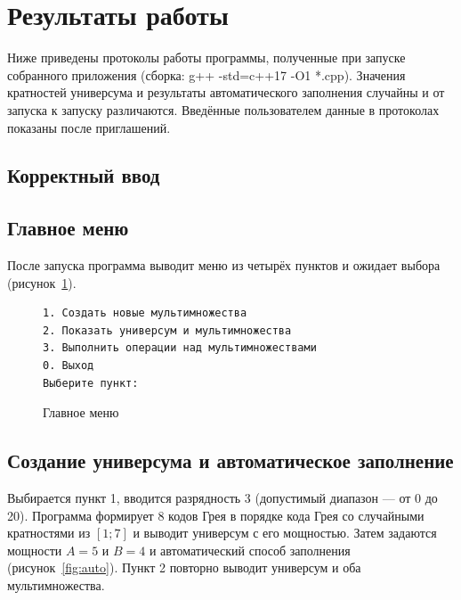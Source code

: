 \documentclass[14pt,a4paper]{extarticle}
\newcommand{\codefont}{\renewcommand{\baselinestretch}{1}\monofont\fontsize{10}{12}\selectfont}
\let\oldsection\section
\renewcommand\section{\clearpage\oldsection}
\newcommand{\code}[1]{{\monofont #1}}
\begin{document}
\section{Результаты работы}

Ниже приведены протоколы работы программы, полученные при запуске собранного приложения (сборка: \code{g++ -std=c++17 -O1 *.cpp}). Значения кратностей универсума и результаты автоматического заполнения случайны и от запуска к запуску различаются. Введённые пользователем данные в протоколах показаны после приглашений.

\subsection*{Корректный ввод}

\subsection{Главное меню}

После запуска программа выводит меню из четырёх пунктов и ожидает выбора (рисунок~\ref{fig:menu}).

\begin{figure}[H]
\begin{Verbatim}[frame=single,framesep=4pt,breaklines=true,formatcom=\codefont]
1. Создать новые мультимножества
2. Показать универсум и мультимножества
3. Выполнить операции над мультимножествами
0. Выход
Выберите пункт: 
\end{Verbatim}
\caption{Главное меню}\label{fig:menu}
\end{figure}

\subsection{Создание универсума и автоматическое заполнение}

Выбирается пункт 1, вводится разрядность 3 (допустимый диапазон --- от 0 до 20). Программа формирует 8 кодов Грея в порядке кода Грея со случайными кратностями из $[1;7]$ и выводит универсум с его мощностью. Затем задаются мощности $A=5$ и $B=4$ и автоматический способ заполнения (рисунок~\ref{fig:auto}). Пункт 2 повторно выводит универсум и оба мультимножества.
\end{document}
